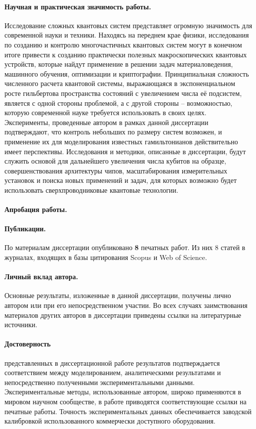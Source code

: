\documentclass[14pt, a4paper]{extarticle}
\begin{document}
\paragraph{Научная и практическая значимость работы.} Исследование сложных квантовых систем представляет огромную значимость для современной науки и техники. Находясь на переднем крае физики, исследования по созданию и контролю многочастичных квантовых систем могут в конечном итоге привести к созданию практически полезных макроскопических квантовых устройств, которые найдут применение в решении задач материаловедения, машинного обучения, оптимизации и криптографии. Принципиальная сложность численного расчета квантовой системы, выражающаяся в экспоненциальном росте гильбертова пространства состояний с увеличением числа её подсистем, является с одной стороны проблемой, а с другой стороны -- возможностью, которую современной науке требуется использовать в своих целях. Эксперименты, проведенные автором в рамках данной диссертации подтверждают, что контроль небольших по размеру систем возможен, и применение их для моделирования известных гамильтонианов действительно имеет перспективы. Исследования и методики, описанные в диссертации, будут служить основой для дальнейшего увеличения числа кубитов на образце, совершенствования архитектуры чипов, масштабирования измерительных установок и поиска новых применений и задач, для которых возможно будет использовать сверхпроводниковые квантовые технологии.


\paragraph{Апробация работы.} 

\paragraph{Публикации.} По материалам диссертации опубликовано \textbf{8} печатных работ. Из них 8 статей в журналах, входящих в базы цитирования Scopus и Web of Science. 

\paragraph{Личный вклад автора.} Основные результаты, изложенные в данной диссертации, получены лично автором или при его непосредственном участии. Во всех случаях
заимствования материалов других авторов в диссертации приведены ссылки
на литературные источники.

\paragraph{Достоверность} представленных в диссертационной работе результатов подтверждается соответствием между моделированием, аналитическими результатами и непосредственно полученными экспериментальными данными. Экспериментальные методы, использованные автором, широко применяются в мировом научном сообществе, в работе приводятся соответствующие ссылки на печатные работы. Точность экспериментальных данных обеспечивается заводской калибровкой использованного коммерчески доступного оборудования.
\end{document}
